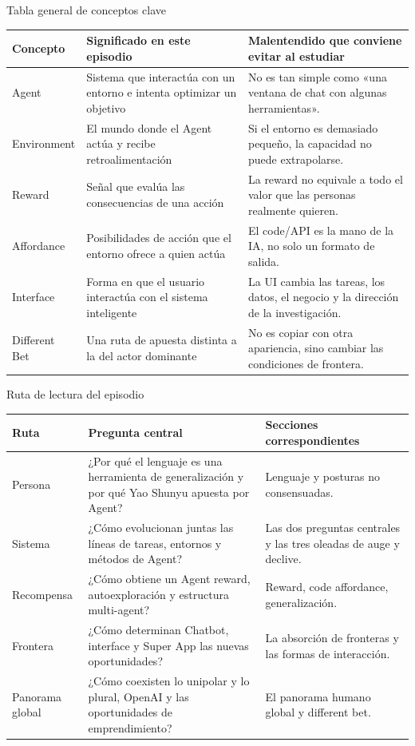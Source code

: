 \documentclass[a4paper]{article}
\begin{document}
\begin{knowledgebox}{Tabla general de conceptos clave}
\begin{tabularx}{\textwidth}{p{}p{}X}
\toprule
Concepto & Significado en este episodio & Malentendido que conviene evitar al estudiar \\
\midrule
Agent & Sistema que interactúa con un entorno e intenta optimizar un objetivo & No es tan simple como «una ventana de chat con algunas herramientas». \\
Environment & El mundo donde el Agent actúa y recibe retroalimentación & Si el entorno es demasiado pequeño, la capacidad no puede extrapolarse. \\
Reward & Señal que evalúa las consecuencias de una acción & La reward no equivale a todo el valor que las personas realmente quieren. \\
Affordance & Posibilidades de acción que el entorno ofrece a quien actúa & El code/API es la mano de la IA, no solo un formato de salida. \\
Interface & Forma en que el usuario interactúa con el sistema inteligente & La UI cambia las tareas, los datos, el negocio y la dirección de la investigación. \\
Different Bet & Una ruta de apuesta distinta a la del actor dominante & No es copiar con otra apariencia, sino cambiar las condiciones de frontera. \\
\bottomrule
\end{tabularx}
\end{knowledgebox}

\begin{knowledgebox}{Ruta de lectura del episodio}
\begin{tabularx}{\textwidth}{p{}p{}X}
\toprule
Ruta & Pregunta central & Secciones correspondientes \\
\midrule
Persona & ¿Por qué el lenguaje es una herramienta de generalización y por qué Yao Shunyu apuesta por Agent? & Lenguaje y posturas no consensuadas. \\
Sistema & ¿Cómo evolucionan juntas las líneas de tareas, entornos y métodos de Agent? & Las dos preguntas centrales y las tres oleadas de auge y declive. \\
Recompensa & ¿Cómo obtiene un Agent reward, autoexploración y estructura multi-agent? & Reward, code affordance, generalización. \\
Frontera & ¿Cómo determinan Chatbot, interface y Super App las nuevas oportunidades? & La absorción de fronteras y las formas de interacción. \\
Panorama global & ¿Cómo coexisten lo unipolar y lo plural, OpenAI y las oportunidades de emprendimiento? & El panorama humano global y different bet. \\
\bottomrule
\end{tabularx}
\end{knowledgebox}
\end{document}
